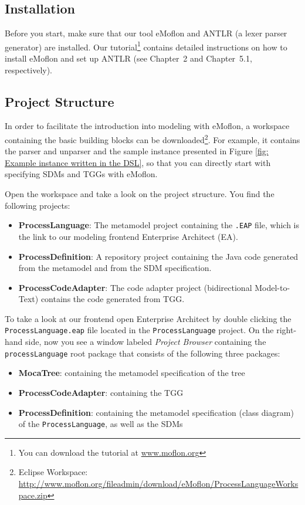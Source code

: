 \subsection{Installation} 
Before you start, make sure that our tool eMoflon and ANTLR (a lexer parser generator) are installed.
Our tutorial\footnote{You can download the tutorial at \url{www.moflon.org}} contains detailed instructions on how to install eMoflon and set up ANTLR (see Chapter~2 and Chapter~5.1, respectively).



\subsection{Project Structure}
In order to facilitate the introduction into modeling with eMoflon, a workspace containing the basic building blocks can be downloaded\footnote{Eclipse Workspace: \url{http://www.moflon.org/fileadmin/download/eMoflon/ProcessLanguageWorkspace.zip}}. For example, it contains the parser and unparser and the sample instance presented in Figure \ref{fig: Example instance written in the DSL}, so that you can directly start with specifying SDMs and TGGs with eMoflon.

Open the workspace and take a look on the project structure. You find the following projects:
\begin{itemize}
  \item \textbf{ProcessLanguage}: The metamodel project containing the \texttt{.EAP} file, which is the link to our modeling frontend Enterprise Architect (EA). 
  \item\textbf{ProcessDefinition}: A repository project containing the Java code generated from the metamodel and from the SDM specification.
  \item \textbf{ProcessCodeAdapter}: The code adapter project (bidirectional Model-to-Text) contains the code generated from TGG.
\end{itemize}


To take a look at our frontend open Enterprise Architect by double clicking the \texttt{ProcessLanguage.eap} file located in the \texttt{ProcessLanguage} project. 
On the right-hand side, now you see a window labeled \textit{Project Browser} containing the \texttt{processLanguage} root package that consists of the following three packages:
\begin{itemize}
  \item \textbf{MocaTree}: containing the metamodel specification of the tree
  \item \textbf{ProcessCodeAdapter}: containing the TGG  
  \item \textbf{ProcessDefinition}: containing the metamodel specification (class diagram) of the \texttt{ProcessLanguage}, as well as the SDMs
\end{itemize}




